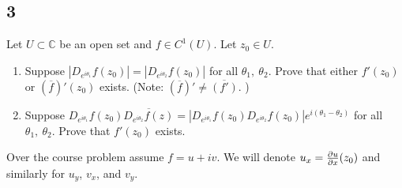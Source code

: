 \documentclass[12pt]{article}
\begin{document}
\subsection*{3}
\begin{tcolorbox}
Let $U\subset \mathbb{C}$ be an open set  and  $f\in C^1(U)$. Let $z_0\in U$.
\begin{enumerate}[label=(\alph*),itemsep=1ex]
\item Suppose $|D_{e^{i\theta_1}}f(z_0)|=|D_{e^{i\theta_2}}f(z_0)|$  for all $\theta_1,\ \theta_2$.  Prove that either $f'(z_0)$ or $(\overline{f})'(z_0)$ exists. (Note: $(\overline{f})'\neq    \overline{(f')}$. )
\item Suppose $D_{e^{i\theta_1}}f(z_0) \overline{  D_{e^{i\theta_2}}f(z)}=|D_{e^{i\theta_1}}f(z_0)   D_{e^{i\theta_2}}f(z_0)|e^{i(\theta_1-\theta_2)}$ for all $\theta_1,\ \theta_2$. Prove that   $f'(z_0)$ exists.
\end{enumerate}
\end{tcolorbox}
Over the course problem assume $f = u + iv$. We will denote $u_x = \frac{\partial u}{\partial x}(z_{0})$ and similarly for $u_y$, $v_x$, and $v_y$. 
\end{document}
